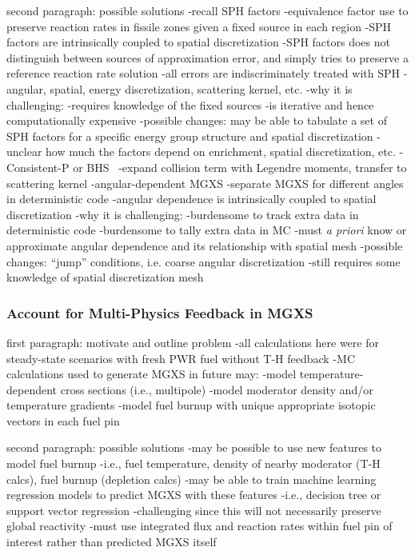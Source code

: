 second paragraph: possible solutions
-recall \ac{SPH} factors
  -equivalence factor use to preserve reaction rates in fissile zones given a fixed source in each region
  -\ac{SPH} factors are intrinsically coupled to spatial discretization
  -\ac{SPH} factors does not distinguish between sources of approximation error, and simply tries to preserve a reference reaction rate solution
    -all errors are indiscriminately treated with \ac{SPH}
      -angular, spatial, energy discretization, scattering kernel, etc. 
  -why it is challenging: 
    -requires knowledge of the fixed sources
    -is iterative and hence computationally expensive
  -possible changes: may be able to tabulate a set of \ac{SPH} factors for a specific energy group structure and spatial discretization
  -unclear how much the factors depend on enrichment, spatial discretization, etc.
-Consistent-P or BHS~\cite{bell1967transport}
  -expand collision term with Legendre moments, transfer to scattering kernel
-angular-dependent \ac{MGXS}
  -separate \ac{MGXS} for different angles in deterministic code
  -angular dependence is intrinsically coupled to spatial discretization
  -why it is challenging:
    -burdensome to track extra data in deterministic code
    -burdensome to tally extra data in \ac{MC}
    -must \textit{a priori} know or approximate angular dependence and its relationship with spatial mesh
  -possible changes: ``jump'' conditions, i.e. coarse angular discretization
    -still requires some knowledge of spatial discretization mesh

\subsubsection{Account for Multi-Physics Feedback in MGXS}
\label{subsubsec:chap12-multi-physics-mgxs}

first paragraph: motivate and outline problem
-all calculations here were for steady-state scenarios with fresh \ac{PWR} fuel without T-H feedback
-\ac{MC} calculations used to generate \ac{MGXS} in future may:
  -model temperature-dependent cross sections (i.e., multipole)
  -model moderator density and/or temperature gradients
  -model fuel burnup with unique appropriate isotopic vectors in each fuel pin

second paragraph: possible solutions
-may be possible to use new features to model fuel burnup
  -i.e., fuel temperature, density of nearby moderator (T-H calcs), fuel burnup (depletion calcs)
-may be able to train machine learning regression models to predict \ac{MGXS} with these features
  -i.e., decision tree or support vector regression
  -challenging since this will not necessarily preserve global reactivity
    -must use integrated flux and reaction rates within fuel pin of interest rather than predicted \ac{MGXS} itself

